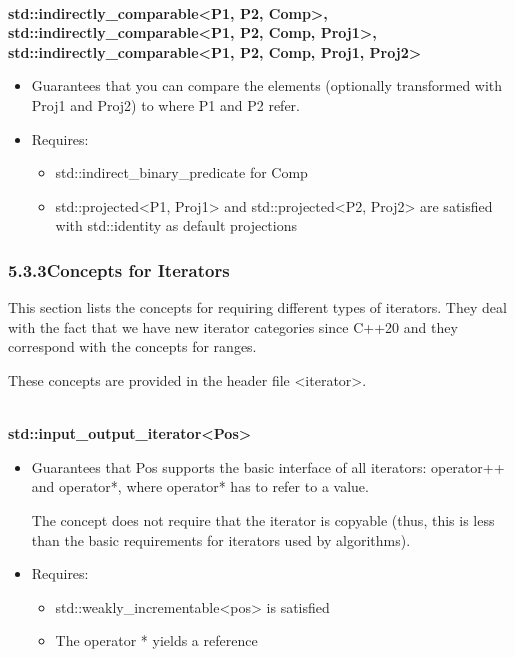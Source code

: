\noindent
\hspace*{\fill} \\ %
\textbf{std::indirectly\_comparable<P1, P2, Comp>, std::indirectly\_comparable<P1, P2, Comp, Proj1>, std::indirectly\_comparable<P1, P2, Comp, Proj1, Proj2>}

\begin{itemize}
\item
Guarantees that you can compare the elements (optionally transformed with Proj1 and Proj2) to where P1 and P2 refer.

\item
Requires:
\begin{itemize}
\item
std::indirect\_binary\_predicate for Comp

\item
std::projected<P1, Proj1> and std::projected<P2, Proj2> are satisfied with std::identity as default projections
\end{itemize}
\end{itemize}

\subsubsection*{ 5.3.3\hspace{0.2cm}Concepts for Iterators}

This section lists the concepts for requiring different types of iterators. They deal with the fact that we have new iterator categories since C++20 and they correspond with the concepts for ranges.

These concepts are provided in the header file <iterator>.

\noindent
\hspace*{\fill} \\ %
\textbf{std::input\_output\_iterator<Pos>}

\begin{itemize}
\item
Guarantees that Pos supports the basic interface of all iterators: operator++ and operator*, where operator* has to refer to a value.

The concept does not require that the iterator is copyable (thus, this is less than the basic requirements for iterators used by algorithms).

\item
Requires:
\begin{itemize}
\item
std::weakly\_incrementable<pos> is satisfied

\item
The operator * yields a reference
\end{itemize}
\end{itemize}

